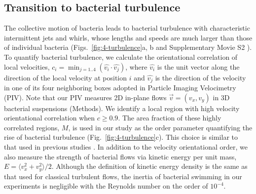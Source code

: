 \subsection{Transition to bacterial turbulence}
The collective motion of bacteria leads to bacterial turbulence with characteristic intermittent jets and whirls, whose lengths and speeds are much larger than those of individual bacteria (Figs.~\ref{fig:4-turbulence}a, b and Supplementary Movie S2 \cite{suppMovies}). To quantify bacterial turbulence, we calculate the orientational correlation of local velocities, $c_i=\min_{j=1..4}(\hat{v_i}\cdot\hat{v_j})$, where $\hat{v_i}$ is the unit vector along the direction of the local velocity at position $i$ and $\hat{v_j}$ is the direction of the velocity in one of its four neighboring boxes adopted in Particle Imaging Velocimetry (PIV).
Note that our PIV measures 2D in-plane flows $\vec{v}=(v_x, v_y)$ in 3D bacterial suspensions (Methods). We identify a local region with high velocity orientational correlation when $c \ge 0.9$. The area fraction of these highly correlated regions, $M$, is used in our study as the order parameter quantifying the rise of bacterial turbulence (Fig.~\ref{fig:4-turbulence}c). This choice is similar to that used in previous studies \cite{Cisneros2011}. In addition to the velocity orientational order, we also measure the strength of bacterial flows via kinetic energy per unit mass, $E=\langle v_x^2 + v_y^2 \rangle / 2$.
Although the definition of kinetic energy density is the same as that used for classical turbulent flows, the inertia of bacterial swimming in our experiments is negligible with the Reynolds number on the order of $10^{-4}$.

